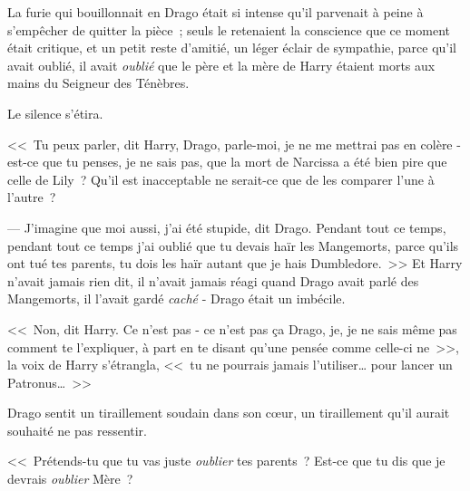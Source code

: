 \later

La furie qui bouillonnait en Drago était si intense qu'il parvenait à peine à s'empêcher de quitter la pièce~; seuls le retenaient la conscience que ce moment était critique, et un petit reste d'amitié, un léger éclair de sympathie, parce qu'il avait oublié, il avait \emph{oublié} que le père et la mère de Harry étaient morts aux mains du Seigneur des Ténèbres.

Le silence s'étira.

<<~Tu peux parler, dit Harry, Drago, parle-moi, je ne me mettrai pas en colère - est-ce que tu penses, je ne sais pas, que la mort de Narcissa a été bien pire que celle de Lily~? Qu'il est inacceptable ne serait-ce que de les comparer l'une à l'autre~?

--- J'imagine que moi aussi, j'ai été stupide, dit Drago. Pendant tout ce temps, pendant tout ce temps j'ai oublié que tu devais haïr les Mangemorts, parce qu'ils ont tué tes parents, tu dois les haïr autant que je hais Dumbledore.~>> Et Harry n'avait jamais rien dit, il n'avait jamais réagi quand Drago avait parlé des Mangemorts, il l'avait gardé \emph{caché} - Drago était un imbécile.

<<~Non, dit Harry. Ce n'est pas - ce n'est pas ça Drago, je, je ne sais même pas comment te l'expliquer, à part en te disant qu'une pensée comme celle-ci ne~>>, la voix de Harry s'étrangla, <<~tu ne pourrais jamais l'utiliser… pour lancer un Patronus…~>>

Drago sentit un tiraillement soudain dans son cœur, un tiraillement qu'il aurait souhaité ne pas ressentir.

<<~Prétends-tu que tu vas juste \emph{oublier} tes parents~? Est-ce que tu dis que je devrais \emph{oublier} Mère~?

